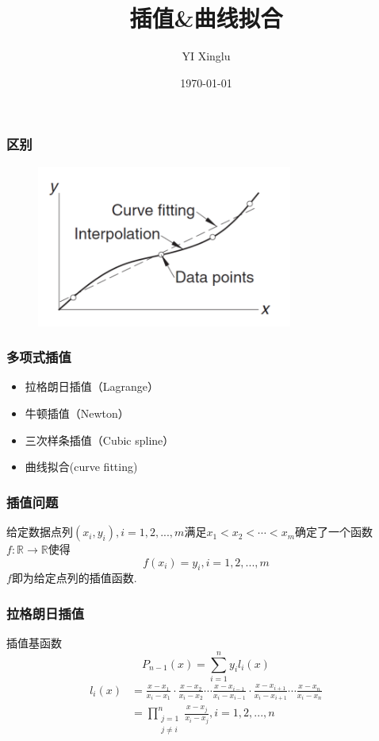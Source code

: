 \documentclass[red,compress]{beamer}
\begin{document}
\title{插值\&曲线拟合}
\author{YI Xinglu}
\date{\today}
\frame{\titlepage}
\begin{frame}
\frametitle{区别}
\begin{figure}
\centering
\includegraphics[width=0.75\textwidth]{int.png}
\end{figure}
\end{frame}
\begin{frame}
\frametitle{多项式插值}
\begin{itemize}
\item 拉格朗日插值（Lagrange）
\item 牛顿插值（Newton）
\item 三次样条插值（Cubic spline）
\item 曲线拟合(curve fitting)
\end{itemize}
\end{frame}
\begin{frame}
\frametitle{插值问题}
给定数据点列$(x_i,y_i), i=1,2,...,m$满足$x_1<x_2<\cdots<x_m$确定了一个函数$f:\mathbb{R}\rightarrow\mathbb{R}$使得
\begin{equation*}
	f(x_i)=y_i, i=1,2,...,m
\end{equation*}
$f$即为给定点列的插值函数.
\end{frame}
\begin{frame}
\frametitle{拉格朗日插值}
插值基函数
\begin{equation*}
	P_{n-1}(x)=\sum_{i=1}^{n}y_{i}l_{i}(x)
\end{equation*}
\begin{align*}
	l_{i}(x)&=\frac{x-x_1}{x_i-x_1}\cdot\frac{x-x_2}{x_i-x_2}\cdots\frac{x-x_{i-1}}{x_i-x_{i-1}}\cdot\frac{x-x_{i+1}}{x_i-x_{i+1}}\cdots\frac{x-x_n}{x_i-x_n} \\
	&=\prod_{\substack{j=1 \\ j\neq i}}^{n}\frac{x-x_j}{x_i-x_j}, i=1,2,...,n
\end{align*}
\end{frame}
\end{document}
